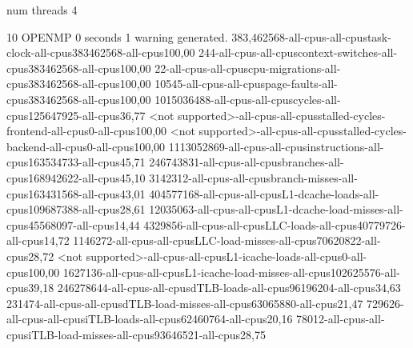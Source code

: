 num threads 4

10
OPENMP
0 seconds
1 warning generated.
383,462568-all-cpus-all-cpustask-clock-all-cpus383462568-all-cpus100,00
244-all-cpus-all-cpuscontext-switches-all-cpus383462568-all-cpus100,00
22-all-cpus-all-cpuscpu-migrations-all-cpus383462568-all-cpus100,00
10545-all-cpus-all-cpuspage-faults-all-cpus383462568-all-cpus100,00
1015036488-all-cpus-all-cpuscycles-all-cpus125647925-all-cpus36,77
<not supported>-all-cpus-all-cpusstalled-cycles-frontend-all-cpus0-all-cpus100,00
<not supported>-all-cpus-all-cpusstalled-cycles-backend-all-cpus0-all-cpus100,00
1113052869-all-cpus-all-cpusinstructions-all-cpus163534733-all-cpus45,71
246743831-all-cpus-all-cpusbranches-all-cpus168942622-all-cpus45,10
3142312-all-cpus-all-cpusbranch-misses-all-cpus163431568-all-cpus43,01
404577168-all-cpus-all-cpusL1-dcache-loads-all-cpus109687388-all-cpus28,61
12035063-all-cpus-all-cpusL1-dcache-load-misses-all-cpus45568097-all-cpus14,44
4329856-all-cpus-all-cpusLLC-loads-all-cpus40779726-all-cpus14,72
1146272-all-cpus-all-cpusLLC-load-misses-all-cpus70620822-all-cpus28,72
<not supported>-all-cpus-all-cpusL1-icache-loads-all-cpus0-all-cpus100,00
1627136-all-cpus-all-cpusL1-icache-load-misses-all-cpus102625576-all-cpus39,18
246278644-all-cpus-all-cpusdTLB-loads-all-cpus96196204-all-cpus34,63
231474-all-cpus-all-cpusdTLB-load-misses-all-cpus63065880-all-cpus21,47
729626-all-cpus-all-cpusiTLB-loads-all-cpus62460764-all-cpus20,16
78012-all-cpus-all-cpusiTLB-load-misses-all-cpus93646521-all-cpus28,75

